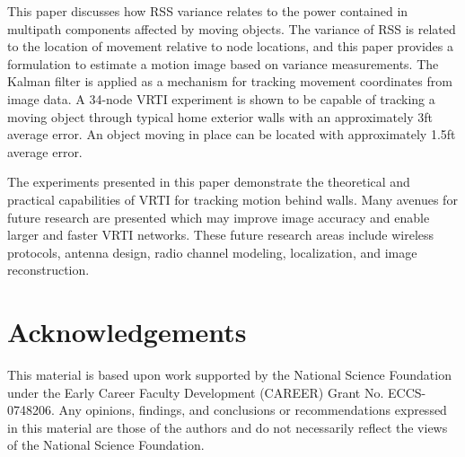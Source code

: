 \documentclass[journal]{IEEEtran}
\begin{document}
This paper discusses how RSS variance relates to the power contained in multipath components affected by moving objects. The variance of RSS is related to the location of movement relative to node locations, and this paper provides a formulation to estimate a motion image based on variance measurements. The Kalman filter is applied as a mechanism for tracking movement coordinates from image data. A 34-node VRTI experiment is shown to be capable of tracking a moving object through typical home exterior walls with an approximately 3ft average error. An object moving in place can be located with approximately 1.5ft average error.

The experiments presented in this paper demonstrate the theoretical and practical capabilities of VRTI for tracking motion behind walls. Many avenues for future research are presented which may improve image accuracy and enable larger and faster VRTI networks. These future research areas include wireless protocols, antenna design, radio channel modeling, localization, and image reconstruction.

\section*{Acknowledgements}
This material is based upon work supported by the National Science Foundation under the Early Career Faculty Development (CAREER) Grant No. ECCS-0748206. Any opinions, findings, and conclusions or recommendations expressed in this material are those of the authors and do not necessarily reflect the views of the National Science Foundation.




\end{document}
